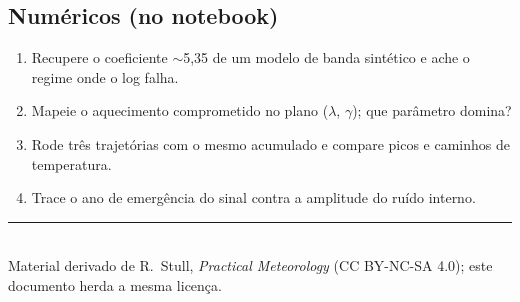 \documentclass[11pt]{article}
\begin{document}
\subsection*{Numéricos (no notebook)}

\begin{enumerate}[label=\textbf{N\arabic*.},itemsep=4pt]
  \item Recupere o coeficiente $\sim$5,35 de um modelo de banda
        sintético e ache o regime onde o log falha.
  \item Mapeie o aquecimento comprometido no plano
        ($\lambda$, $\gamma$); que parâmetro domina?
  \item Rode três trajetórias com o mesmo acumulado e compare picos e
        caminhos de temperatura.
  \item Trace o ano de emergência do sinal contra a amplitude do
        ruído interno.
\end{enumerate}

\vspace{1em}
\noindent\rule{\linewidth}{0.4pt}\\
{\scriptsize Material derivado de R.~Stull, \emph{Practical Meteorology}
(CC BY-NC-SA 4.0); este documento herda a mesma licença.}
\end{document}
